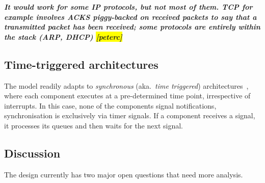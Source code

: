 \documentclass[a4paper,12pt]{report}
\newcommand{\Comment}[1]{\textbf{\textsl{#1}}}
\newcommand{\Comment}[1]{\relax}
\newcommand{\peterc}[1]{\Comment{#1 \colorbox{yellow}{[peterc]}}}
\begin{document}
\peterc{It would work for some IP protocols, but not most of them.  TCP
  for example involves ACKS piggy-backed on received packets to say
  that a transmitted packet has been received; some protocols are
  entirely within the stack (ARP, DHCP)}
\fi
\fi

\subsection{Time-triggered architectures}

The model readily adapts to \emph{synchronous} (aka.\ \emph{time
  triggered}) architectures~\citep{Kopetz_03}, where each component
executes at a pre-determined time point, irrespective of
interrupts. In this case, none of the components signal notifications,
synchronisation is exclusively via timer signals. If a component
receives a signal, it processes its queues and then waits for the next
signal.

\subsection{Discussion}

The design currently has two major open questions that need more analysis.
\end{document}
